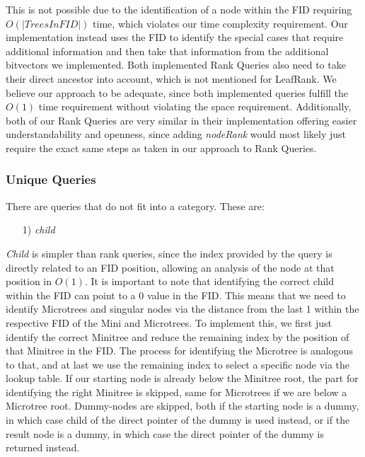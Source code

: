 \documentclass{article}
\begin{document}
This is not possible due to the identification of a node within the FID requiring $O(|Trees In FID|)$ time, which violates our time complexity requirement. Our implementation instead uses the FID to identify the special cases that require additional information and then take that information from the additional bitvectors we implemented. Both implemented Rank Queries also need to take their direct ancestor into account, which is not mentioned for LeafRank.
We believe our approach to be adequate, since both implemented queries fulfill the $O(1)$ time requirement without violating the space requirement. Additionally, both of our Rank Queries are very similar in their implementation offering easier understandability and openness, since adding \textit{nodeRank} would most likely just require the exact same steps as taken in our approach to Rank Queries.

\subsubsection{Unique Queries}
There are queries that do not fit into a category. These are:
\begin{itemize}
	\item[1)] \textit{child}
\end{itemize}
\textit{Child} is simpler than rank queries, since the index provided by the query is directly related to an FID position, allowing an analysis of the node at that position in $O(1)$. It is important to note that identifying the correct child within the FID can point to a 0 value in the FID.
This means that we need to identify Microtrees and singular nodes via the distance from the last 1 within the respective FID of the Mini and Microtrees. To implement this, we first just identify the correct Minitree and reduce the remaining index by the position of that Minitree in the FID.
The process for identifying the Microtree is analogous to that, and at last we use the remaining index to select a specific node via the lookup table. If our starting node is already below the Minitree root, the part for identifying the right Minitree is skipped, same for Microtrees if we are below a Microtree root.
Dummy-nodes are skipped, both if the starting node is a dummy, in which case child of the direct pointer of the dummy is used instead, or if the result node is a dummy, in which case the direct pointer of the dummy is returned instead.
\end{document}
